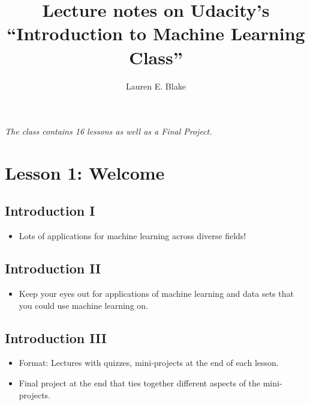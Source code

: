 \documentclass[12pt]{report}
\begin{document}
\title{Lecture notes on Udacity's ``Introduction to Machine Learning Class''}
\author{Lauren E. Blake}

\maketitle

\begin{flushleft}
\Large{\textit{The class contains 16 lessons as well as a Final Project.}}
\end{flushleft}

\section{Lesson 1: Welcome}

\subsection{Introduction I}

\begin{itemize}

\item Lots of applications for machine learning across diverse fields!

\end{itemize}

\subsection{Introduction II}

\begin{itemize}

\item Keep your eyes out for applications of machine learning and data sets that you could use machine learning on. 

\end{itemize}

\subsection{Introduction III}

\begin{itemize}

\item Format: Lectures with quizzes, mini-projects at the end of each lesson.

\item Final project at the end that ties together different aspects of the mini-projects. 

\end{itemize}
\end{document}
